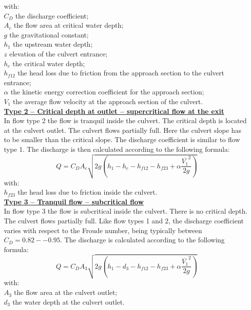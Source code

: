 with:\\
$C_D$ the discharge coefficient;\\
$A_c$ the flow area at critical water depth; \\
$g$ the gravitational constant; \\
$h_1$ the upstream water depth; \\
$z$ elevation of the culvert entrance; \\
$h_c$ the critical water depth; \\
$h_{f12}$ the head loss due to friction from the approach section to the culvert entrance; \\
$\alpha$ the kinetic energy correction coefficient for the approach section; \\
$V_1$ the average flow velocity at the approach section of the culvert.\\

\underline{\textbf{Type 2 -- Critical depth at outlet – supercritical flow at the exit}}\\

In flow type 2 the flow is tranquil inside the culvert. The critical depth is located at 
the culvert outlet. The culvert flows partially full. Here the culvert slope has to be 
smaller than the critical slope. The discharge coefficient is similar to flow type 1. 
The discharge is then calculated according to the following formula:
\begin{equation}
Q=C_D A_c \sqrt{2g\left(h_1-h_c-h_{f12}-h_{f23}+\alpha \dfrac{\overline{V_1}^2}{2g}\right)}
\end{equation}
with:\\
$h_{f23}$ the head loss due to friction inside the culvert.\\

\underline{\textbf{Type 3 -- Tranquil flow -- subcritical flow}}\\

In flow type 3 the flow is subcritical inside the culvert. There is no critical depth. 
The culvert flows partially full. Like flow types 1 and 2, the discharge coefficient 
varies with respect to the Froude number, being typically between $C_D=0.82 -- 0.95$. 
The discharge is calculated according to the following formula:
\begin{equation}
Q=C_D A_3 \sqrt{2g\left(h_1-d_3-h_{f12}-h_{f23}+\alpha \dfrac{\overline{V_1}^2}{2g}\right)}
\end{equation}
with:\\
$A_3$ the flow area at the culvert outlet;\\
$d_3$ the water depth at the culvert outlet.\\

